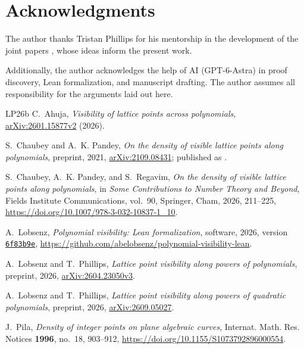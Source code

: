 \documentclass[10pt]{amsart}
\theoremstyle{remark}
\begin{document}
\section*{Acknowledgments}

The author thanks Tristan Phillips for his mentorship in the development of
the joint papers \cite{LP,LPQ}, whose ideas inform the present work. 

Additionally, the author acknowledges the help of AI (GPT-6-Astra) in proof discovery, Lean formalization, and manuscript drafting. The author assumes all responsibility for the arguments laid out here.


\begin{thebibliography}{LP26b}
 C.~Ahuja,
\emph{Visibility of lattice points across polynomials},
\href{https://arxiv.org/abs/2601.15877v2}{arXiv:2601.15877v2} (2026).

 S.~Chaubey and A.~K. Pandey,
\emph{On the density of visible lattice points along polynomials},
preprint, 2021,
\href{https://arxiv.org/abs/2109.08431}{arXiv:2109.08431}; published as \cite{CPR}.

 S.~Chaubey, A.~K. Pandey, and S.~Regavim,
\emph{On the density of visible lattice points along polynomials},
in \emph{Some Contributions to Number Theory and Beyond},
Fields Institute Communications, vol.~90, Springer, Cham, 2026,
211--225, \url{https://doi.org/10.1007/978-3-032-10837-1_10}.

 A.~Lobsenz,
\emph{Polynomial visibility: Lean formalization}, software, 2026,
version \href{https://github.com/abelobsenz/polynomial-visibility-lean/tree/6f83b9e899f2527898601fc3e028e2c016459ae5}{\texttt{6f83b9e}},
\url{https://github.com/abelobsenz/polynomial-visibility-lean}.

 A.~Lobsenz and T.~Phillips,
\emph{Lattice point visibility along powers of polynomials},
preprint, 2026,
\href{https://arxiv.org/abs/2604.23050v3}{arXiv:2604.23050v3}.

 A.~Lobsenz and T.~Phillips,
\emph{Lattice point visibility along powers of quadratic polynomials},
preprint, 2026,
\href{https://arxiv.org/abs/2609.05027}{arXiv:2609.05027}.

 J.~Pila,
\emph{Density of integer points on plane algebraic curves},
Internat. Math. Res. Notices \textbf{1996}, no.~18, 903--912,
\url{https://doi.org/10.1155/S1073792896000554}.
\end{thebibliography}
\end{document}
